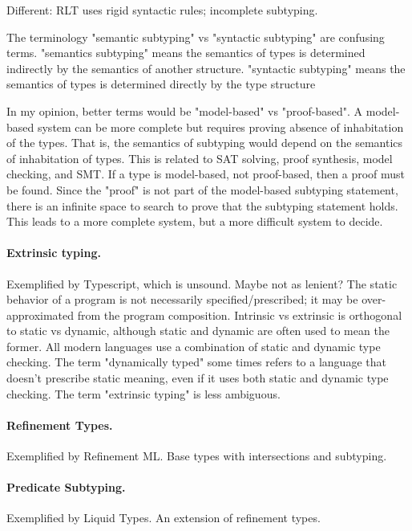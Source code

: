 \documentclass[acmsmall]{acmart}
\begin{document}
Different: RLT uses rigid syntactic rules; incomplete subtyping.

The terminology "semantic subtyping" vs "syntactic subtyping" are confusing terms. 
"semantics subtyping" means the semantics of types is determined indirectly by the semantics of another structure.
"syntactic subtyping" means the semantics of types is determined directly by the type structure

In my opinion, better terms would be "model-based" vs "proof-based".
A model-based system can be more complete but requires proving absence of inhabitation of the types.
That is, the semantics of subtyping would depend on the semantics of inhabitation of types.
This is related to SAT solving, proof synthesis, model checking, and SMT.
If a type is model-based, not proof-based, then a proof must be found.
Since the "proof" is not part of the model-based subtyping statement, 
there is an infinite space to search to prove that the subtyping statement holds.
This leads to a more complete system, but a more difficult system to decide.

\paragraph{Extrinsic typing.}
Exemplified by Typescript, which is unsound. Maybe not as lenient?  
The static behavior of a program is not necessarily specified/prescribed; 
it may be over-approximated from the program composition. 
Intrinsic vs extrinsic is orthogonal to static vs dynamic, although static and dynamic are often used to mean the former.
All modern languages use a combination of static and dynamic type checking.
The term "dynamically typed" some times refers to a language that doesn't prescribe static meaning,
even if it uses both static and dynamic type checking. The term "extrinsic typing" is less ambiguous.

\paragraph{Refinement Types.}
Exemplified by Refinement ML. Base types with intersections and subtyping.

\paragraph{Predicate Subtyping.}
Exemplified by Liquid Types. An extension of refinement types.
\end{document}
